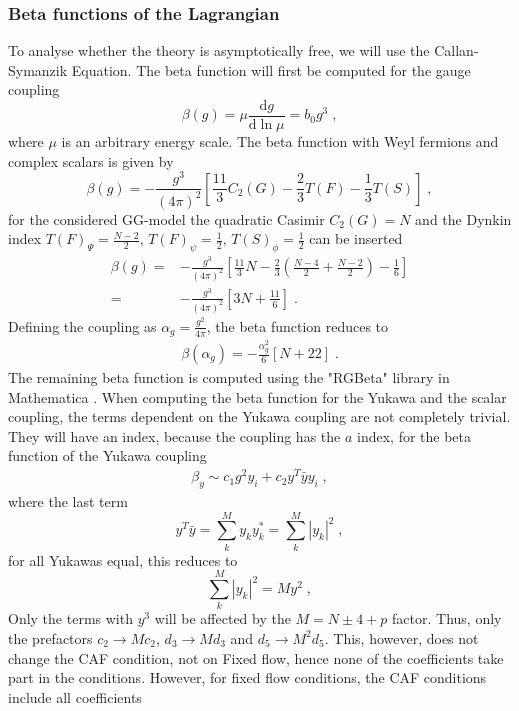 \subsubsection{Beta functions of the Lagrangian}
To analyse whether the theory is asymptotically free, we will use the Callan-Symanzik Equation. The beta function will first be computed for the gauge coupling
\begin{equation}
    \beta(g)=\mu\frac{\text{d}g}{\text{d}\ln\mu}= b_0 g^3\;,
\end{equation}
where $\mu$ is an arbitrary energy scale. The beta function with Weyl fermions and complex scalars is given by \cite{betafunctionstwoloop}
\begin{equation}
    \beta(g)=-\frac{g^3}{(4\pi)^2}\left[\frac{11}{3}C_2(G)-\frac{2}{3}T(F)-\frac{1}{3}T(S)\right]\;,\label{eq:betag1loop}
\end{equation}
for the considered GG-model the quadratic Casimir $C_2(G)=N$ and the Dynkin index $T(F)_\Psi=\frac{N-2}{2},\, T(F)_\psi=\frac{1}{2}, \, T(S)_\phi=\frac{1}{2}$ can be inserted
\begin{align}
    \beta(g)=&-\frac{g^3}{(4\pi)^2}\left[\frac{11}{3}N-\frac{2}{3}\left(\frac{N-4}{2}+\frac{N-2}{2}\right)-\frac{1}{6}\right]
    \\=&-\frac{g^3}{(4\pi)^2}\left[3N+\frac{11}{6}\right]\;.
\end{align}
Defining the coupling as $\alpha_g=\frac{g^2}{4\pi}$, the beta function reduces to
\begin{align}
    \beta(\alpha_g)=-\frac{\alpha_g^2}{6}\left[N+22\right]\;.
\end{align}
The remaining beta function is computed using the "RGBeta" library in Mathematica \cite{Thomsen2021RGBeta}.
When computing the beta function for the Yukawa and the scalar coupling, the terms dependent on the Yukawa coupling are not completely trivial. They will have an index, because the coupling has the $a$ index, for the beta function of the Yukawa coupling
\begin{align}
    \beta_{y}\sim c_1g^2y_i + c_2 y^T \bar y y_i\;, 
\end{align} 
where the last term
\begin{equation}
    y^T \bar y =\sum_k^M y_k y_k^*=\sum^M_k |y_k|^2\;,
\end{equation}
for all Yukawas equal, this reduces to
\begin{equation}
   \sum^M_k |y_k|^2=My^2\;,
\end{equation}
Only the terms with $y^3$ will be affected by the $M=N\pm4 +p$ factor. Thus, only the prefactors $c_2\to M c_2$,  $d_3\to M d_3$ and  $d_5\to M^2 d_5$. This, however, does not change the CAF condition, not on Fixed flow, hence none of the coefficients take part in the conditions. However, for fixed flow conditions, the CAF conditions include all coefficients
